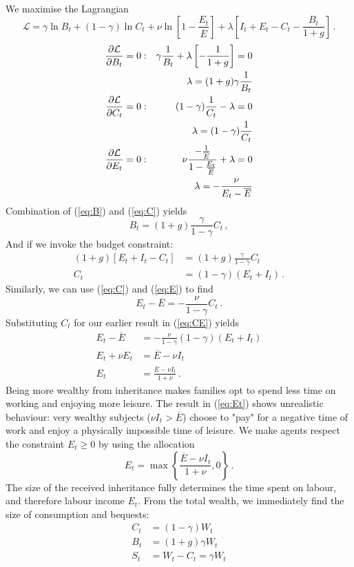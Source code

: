 We maximise the Lagrangian
\begin{equation}
    \mathcal{L} = \gamma \ln B_t + (1-\gamma)\ln C_t + \nu \ln \left[1-\frac{E_t}{\overline{E}} \right] + \lambda \left[I_t + E_t - C_t - \frac{B_t}{1+g}\right]\,.
\end{equation}
\begin{align}
    \pdv{\mathcal{L}}{B_t} &= 0: &\gamma \frac{1}{B_t} + \lambda\left[-\frac{1}{1+g}\right] = 0\\
    \label{eq:B}
    && \lambda = (1+g) \gamma \frac{1}{B_t}\\
    \pdv{\mathcal{L}}{C_t} &=0: & (1-\gamma)\frac{1}{C_t} - \lambda = 0\\
    \label{eq:C}
    && \lambda = (1-\gamma)\frac{1}{C_t}\\
    \pdv{\mathcal{L}}{E_t} &=0 : &\nu \frac{-\frac{1}{\overline{E}}}{1-\frac{E_t}{\overline{E}}} + \lambda = 0\\
    \label{eq:E}
    && \lambda = - \frac{\nu}{E_t-\overline{E}}
\end{align}
Combination of (\ref{eq:B}) and (\ref{eq:C}) yields
\begin{equation}
    B_t = (1+g) \frac{\gamma}{1-\gamma} C_t\,,
\end{equation}
And if we invoke the budget constraint:
\begin{align}
    (1+g) \left[ E_t + I_t - C_t \right] &= (1+g) \frac{\gamma}{1-\gamma} C_t\\
    C_t &= (1-\gamma) (E_t + I_t)\,. \label{eq:CE}
\end{align}
Similarly, we can use (\ref{eq:C}) and (\ref{eq:E}) to find
\begin{equation}
E_t - \overline{E} = -\frac{\nu}{1-\gamma}C_t\,.
\end{equation}
Substituting $C_t$ for our earlier result in (\ref{eq:CE}) yields
\begin{align}
E_t - \overline{E} &= -\frac{\nu}{1-\gamma}(1-\gamma) (E_t + I_t)\\
E_t + \nu E_t &= \overline{E} - \nu I_t\\
E_t &= \frac{\overline{E} - \nu I_t}{1 + \nu}\,.
\label{eq:Et}
\end{align}
Being more wealthy from inheritance makes families opt to spend less time on working and enjoying more leisure. The result in (\ref{eq:Et}) shows unrealistic behaviour: very wealthy subjects ($\nu I_t > \overline{E}$) choose to "pay" for a negative time of work and enjoy a physically impossible time of leisure. We make agents respect the constraint $E_t\geq0$ by using the allocation
\begin{equation}
    E_t = \max \left\{ \frac{\overline{E} - \nu I_t}{1 + \nu} , 0 \right\}\,.
\end{equation}
The size of the received inheritance fully determines the time spent on labour, and therefore labour income $E_t$. From the total wealth, we immediately find the size of consumption and bequests:
\begin{align}
    C_t &= (1-\gamma)W_t\\
    B_t &= (1+g)\gamma W_t \\
    S_t &= W_t - C_t = \gamma W_t
\end{align}

